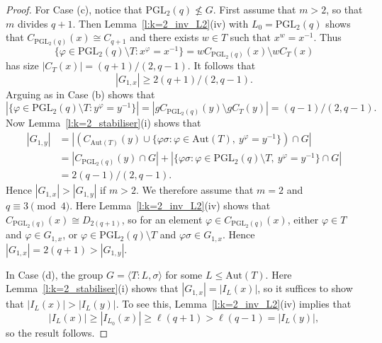 \documentclass[twoside,a4paper,reqno,11pt]{amsart}
\newcommand{\<}{\langle}
\renewcommand{\>}{\rangle}
\newcommand{\la}{\langle}
\newcommand{\ra}{\rangle}
\newcommand{\leqs}{\leqslant}
\newcommand{\geqs}{\geqslant}
\newcommand{\Aut}{\mathrm{Aut}}
\newcommand{\PGL}{\mathrm{PGL}}
\theoremstyle{definition}
\begin{document}
\begin{proof}
    For Case (c), notice that $\PGL_2(q)\not\leqs G$. First assume that $m>2$, so that $m$ divides $q+1$. Then Lemma~\ref{l:k=2_inv_L2}(iv) with $L_0 = \PGL_2(q)$ shows that $C_{\PGL_2(q)}(x) \cong C_{q+1}$ and there exists $w\in T$ such that $x^w = x^{-1}$. Thus
    \begin{equation*}
        \{\varphi \in \PGL_2(q)\setminus T : x^\varphi = x^{-1}\} = wC_{\PGL_2(q)}(x)\setminus wC_{T}(x)
    \end{equation*}
    has size $|C_{T}(x)| = (q+1)/(2,q-1)$. It follows that
    \begin{equation*}
        |G_{1,x}| \geqs 2(q+1)/(2,q-1).
    \end{equation*}
    Arguing as in Case (b) shows that
    \begin{equation*}
        |\{\varphi \in\PGL_2(q)\setminus T :y^\varphi = y^{-1}\}| = |gC_{\PGL_2(q)}(y)\setminus gC_{T}(y)| = (q-1)/(2,q-1).
    \end{equation*}
    Now Lemma~\ref{l:k=2_stabiliser}(i) shows that
    \begin{equation*}
    \begin{aligned}
        |G_{1,y}| &= |(C_{\Aut(T)}(y)\cup \{\varphi\sigma : \varphi \in \Aut(T), \  y^{\varphi} = y^{-1}\})\cap G| \\
        &= |C_{\PGL_2(q)}(y)\cap G| + |\{\varphi\sigma : \varphi\in\PGL_2(q)\setminus T, \ y^{\varphi} = y^{-1} \}\cap G|\\
        &= 2(q-1)/(2,q-1).
    \end{aligned}
    \end{equation*}
    Hence $|G_{1,x}| > |G_{1, y}|$ if $m>2$. We therefore assume that $m = 2$ and $q\equiv 3\pmod 4$. Here Lemma~\ref{l:k=2_inv_L2}(iv) shows that $C_{\PGL_2(q)}(x) \cong D_{2(q+1)}$, so for an element $\varphi\in C_{\PGL_2(q)}(x)$, either $\varphi\in T$ and $\varphi\in G_{1,x}$, or $\varphi\in\PGL_2(q)\setminus T$ and $\varphi\sigma\in G_{1,x}$. Hence $|G_{1,x}| = 2(q+1) > |G_{1,y}|$.

    In Case (d), the group $G = \la T{:}L,\sigma\ra$ for some $L\leqs \Aut(T)$. Here  Lemma~\ref{l:k=2_stabiliser}(i) shows that $|G_{1, x}| = |I_L(x)|$, so it suffices to show that $|I_L(x)| > |I_L(y)|$. To see this, Lemma~\ref{l:k=2_inv_L2}(iv) implies that
    \begin{equation*}
        |I_L(x)| \geqs |I_{L_0}(x)| \geqs \ell(q+1) > \ell(q-1) = |I_L(y)|,
    \end{equation*}
    so the result follows.
\end{proof}
\end{document}
